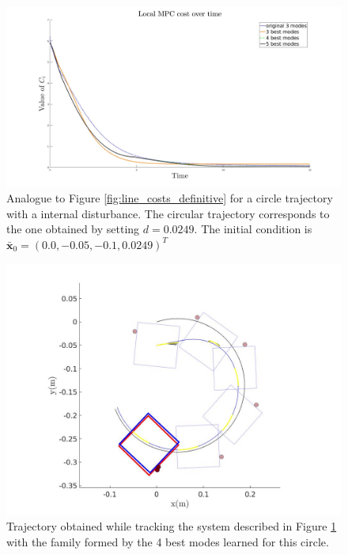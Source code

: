 \documentclass[12,twoside]{TFG-GM}
\theoremstyle{definition}
\theoremstyle{remark}
\newcommand*\diff[1]{\bar{#1}}
\begin{document}
\begin{figure}[htb!]
\begin{center}
\includegraphics[width=16cm]{local_mpc_cost_over_time_circle_definitive.jpg}
\caption{\label{fig:old_vs_new_circle_internal} \small Analogue to Figure \ref{fig:line_costs_definitive} for a circle trajectory with a internal disturbance. The circular trajectory corresponds to the one obtained by setting $d = 0.0249$. The initial condition is $\diff{\textbf{x}}_0 = (0.0, -0.05, -0.1, 0.0249)^T$}
\end{center}
\end{figure}

\begin{figure}[htb!]
\begin{center}
\includegraphics[width=13cm]{trajectory_4_modes_circle_definitive.jpg}
\caption{\label{fig:old_vs_new_circle_internal_trajectory} \small Trajectory obtained while tracking the system described in Figure \ref{fig:old_vs_new_circle_internal} with the family formed by the 4 best modes learned for this circle.}
\end{center}
\end{figure}
\end{document}
